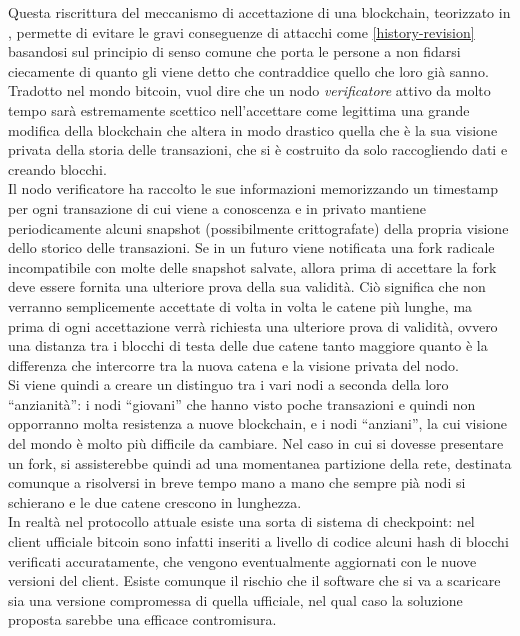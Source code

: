 Questa riscrittura del meccanismo di accettazione di una blockchain, teorizzato in \cite{bitter-better}, permette di evitare le gravi conseguenze di attacchi come \ref{history-revision} basandosi sul principio di senso comune che porta le persone a non fidarsi ciecamente di quanto gli viene detto che contraddice quello che loro già sanno.
Tradotto nel mondo bitcoin, vuol dire che un nodo \emph{verificatore} attivo da molto tempo sarà estremamente scettico nell'accettare come legittima una grande modifica della blockchain che altera in modo drastico quella che è la sua visione privata della storia delle transazioni, che si è costruito da solo raccogliendo dati e creando blocchi.\\
Il nodo verificatore ha raccolto le sue informazioni memorizzando un timestamp per ogni transazione di cui viene a conoscenza e in privato mantiene periodicamente alcuni snapshot (possibilmente crittografate) della propria visione dello storico delle transazioni. Se in un futuro viene notificata una fork radicale incompatibile con molte delle snapshot salvate, allora prima di accettare la fork deve essere fornita una ulteriore prova della sua validità. Ciò significa che non verranno semplicemente accettate di volta in volta le catene più lunghe, ma prima di ogni accettazione verrà richiesta una ulteriore prova di validità, ovvero una distanza tra i blocchi di testa delle due catene tanto maggiore quanto è la differenza che intercorre tra la nuova catena e la visione privata del nodo.\\
Si viene quindi a creare un distinguo tra i vari nodi a seconda della loro ``anzianità'': i nodi ``giovani'' che hanno visto poche transazioni e quindi non opporranno molta resistenza a nuove blockchain, e i nodi ``anziani'', la cui visione del mondo è molto più difficile da cambiare. Nel caso in cui si dovesse presentare un fork, si assisterebbe quindi ad una momentanea partizione della rete, destinata comunque a risolversi in breve tempo mano a mano che sempre pià nodi si schierano e le due catene crescono in lunghezza.\\
In realtà nel protocollo attuale esiste una sorta di sistema di checkpoint: nel client ufficiale bitcoin sono infatti inseriti a livello di codice alcuni hash di blocchi verificati accuratamente, che vengono eventualmente aggiornati con le nuove versioni del client. Esiste comunque il rischio che il software che si va a scaricare sia una versione compromessa di quella ufficiale, nel qual caso la soluzione proposta sarebbe una efficace contromisura.

